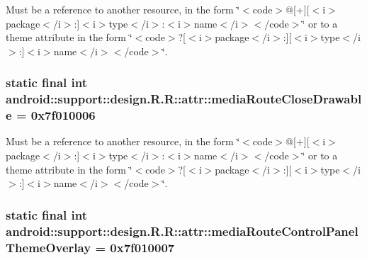 Must be a reference to another resource, in the form \char`\"{}$<$code$>$@\mbox{[}+\mbox{]}\mbox{[}$<$i$>$package$<$/i$>$:\mbox{]}$<$i$>$type$<$/i$>$:$<$i$>$name$<$/i$>$$<$/code$>$\char`\"{} or to a theme attribute in the form \char`\"{}$<$code$>$?\mbox{[}$<$i$>$package$<$/i$>$:\mbox{]}\mbox{[}$<$i$>$type$<$/i$>$:\mbox{]}$<$i$>$name$<$/i$>$$<$/code$>$\char`\"{}. \hypertarget{classandroid_1_1support_1_1design_1_1_r_1_1attr_4123062ba5b263c77ca0aa22cfca6cb0}{
\subsubsection[{mediaRouteCloseDrawable}]{\setlength{\rightskip}{0pt plus 5cm}static final int android::support::design.R.R::attr::mediaRouteCloseDrawable = 0x7f010006}}
\label{classandroid_1_1support_1_1design_1_1_r_1_1attr_4123062ba5b263c77ca0aa22cfca6cb0}


Must be a reference to another resource, in the form \char`\"{}$<$code$>$@\mbox{[}+\mbox{]}\mbox{[}$<$i$>$package$<$/i$>$:\mbox{]}$<$i$>$type$<$/i$>$:$<$i$>$name$<$/i$>$$<$/code$>$\char`\"{} or to a theme attribute in the form \char`\"{}$<$code$>$?\mbox{[}$<$i$>$package$<$/i$>$:\mbox{]}\mbox{[}$<$i$>$type$<$/i$>$:\mbox{]}$<$i$>$name$<$/i$>$$<$/code$>$\char`\"{}. \hypertarget{classandroid_1_1support_1_1design_1_1_r_1_1attr_b687e9edbbb9b659bd79dadfb2d63040}{
\subsubsection[{mediaRouteControlPanelThemeOverlay}]{\setlength{\rightskip}{0pt plus 5cm}static final int android::support::design.R.R::attr::mediaRouteControlPanelThemeOverlay = 0x7f010007}}
\label{classandroid_1_1support_1_1design_1_1_r_1_1attr_b687e9edbbb9b659bd79dadfb2d63040}


